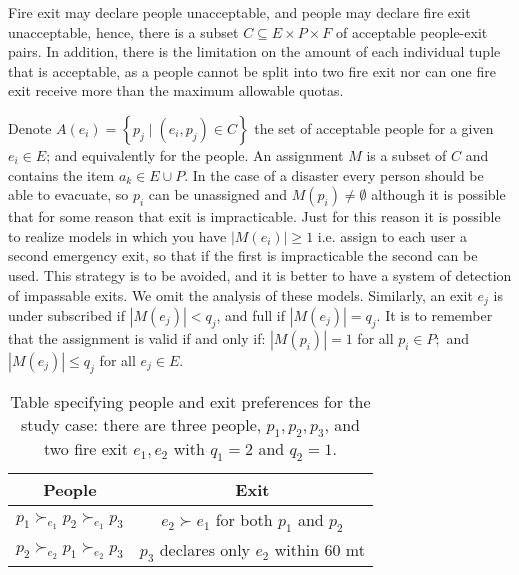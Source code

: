 
    Fire exit may declare people unacceptable, and people may declare fire exit unacceptable,
    hence, there is a subset \(C \subseteq E \times P \times F\) of acceptable people-exit pairs.
    In addition, there is the limitation on the amount of each individual tuple that is acceptable, as a people
    cannot be split into two fire exit nor can one fire exit receive more than the maximum allowable quotas.

    Denote \( A \left( e _ { i } \right) = \left\{ p _ { j } \mid \left( e _ { i } , p _ { j } \right) \in C \right\} \)
    the set of acceptable people for a given \( e _ { i } \in E \); and equivalently for the people.
    An assignment \(M\) is a subset of \(C\) and contains the item \( a _ { k } \in E \cup P \).
    In the case of a disaster every person should be able to evacuate, so  \( p _ { i } \) can be unassigned and
    \( M \left( p _ { i } \right) \neq \emptyset \) although it is possible that for some reason that exit is impracticable.
    Just for this reason it is possible to realize models in which you have \(|M \left( e _ { i } \right)| \geq 1\)
    i.e. assign to each user a second emergency exit, so that if the first is impracticable the second can be used.
    This strategy is to be avoided, and it is better to have a system of detection of impassable exits.
    We omit the analysis of these models.
    Similarly, an exit \( e _ { j } \) is  under subscribed if
    \( \left| M \left( e _ { j } \right) \right| < q _ { j } \), and full if
    \( \left| M \left( e _ { j } \right) \right| = q _ { j } \).
    It is to remember that the assignment is valid if and only if:
    \( \left| M \left( p _ { i } \right) \right| = 1 \) for all \( p _ { i } \in P ; \) and
    \( \left| M \left( e _ { j } \right) \right| \leq q _ { j } \) for all \( e _ { j } \in E  \).

    \begin{table}[!htb]
        \begin{tabular}{c|c}
            \hline People                                             & Exit                                                       \\
            \hline\( p_{1} \succ_{e_{1}} p_{2} \succ_{e_{1}} p_{3} \) & \( e_{2} \succ e_{1} \) for both \( p_{1} \) and \( p_{2} \) \\
            \( p_{2} \succ_{e_{2}} p_{1} \succ_{e_{2}} p_{3} \)       & \( p_{3} \) declares only \( e_{2} \) within 60 mt         \\
            \hline
        \end{tabular}
        \caption{Table specifying people and exit preferences for
            the study case: there are three people, \( p _ { 1 } , p _ { 2 } , p _ { 3 } \), and two fire exit
            \( e _ { 1 } , e _ { 2 } \) with \( q _ { 1 } = 2 \) and \( q _ { 2 } = 1 \).}
        \label{tab:people-exit}
    \end{table}